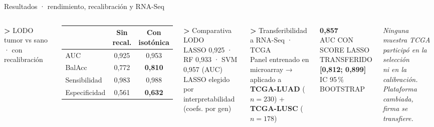 \documentclass[aspectratio=169, 11pt]{beamer}
\newcommand{\kicker}[1]{{\ttfamily\small\color{verdeTerm}\textbf{>} #1}}
\newcommand{\bignum}[1]{{\fontsize{40pt}{40pt}\selectfont\color{verdeTerm}\textbf{#1}}}
\newcommand{\lbl}[1]{{\ttfamily\scriptsize\color{mute}\MakeUppercase{#1}}}
\begin{document}
\begin{frame}{Resultados · rendimiento, recalibración y RNA-Seq}
  \vspace{0.05cm}
  \begin{columns}[T]
    \kicker{LODO tumor vs sano · con recalibración}\\[0.15cm]

    \begin{center}\footnotesize
      \begin{tabular}{@{}lcc@{}}
        \toprule
        & \textbf{Sin recal.} & \textbf{Con isotónica} \\
        \midrule
        AUC          & 0,925 & 0,953 \\
        BalAcc       & 0,772 & \color{verdeTerm}\textbf{0,810} \\
        Sensibilidad & 0,983 & 0,988 \\
        Especificidad& 0,561 & \color{verdeTerm}\textbf{0,632} \\
        \bottomrule
      \end{tabular}
    \end{center}

    \vspace{0.15cm}
    \kicker{Comparativa LODO}\\[0.1cm]
    {\small LASSO 0,925 · RF 0,933 · SVM 0,957 (AUC)\\[0.05cm]
    LASSO elegido por interpretabilidad (coefs. por gen)}

    \kicker{Transferibilidad a RNA-Seq · TCGA}\\[0.15cm]

    {\small Panel entrenado en microarray → aplicado a\\
    \textbf{TCGA-LUAD} ($n=230$) + \textbf{TCGA-LUSC} ($n=178$)}

    \vspace{0.2cm}
    \bignum{0{,}857}\\\lbl{auc con score lasso transferido}\\[0.1cm]
    {\fontsize{22pt}{22pt}\selectfont\color{verdeTerm}\textbf{[0{,}812; 0{,}899]}}\\\lbl{ic 95\,\% bootstrap}\\[0.2cm]

    {\centering\itshape\footnotesize\color{verdeOsc}
      Ninguna muestra TCGA participó en la selección\\
      ni en la calibración. Plataforma cambiada,\\
      firma se transfiere.\par}
  \end{columns}
\end{frame}
\end{document}
